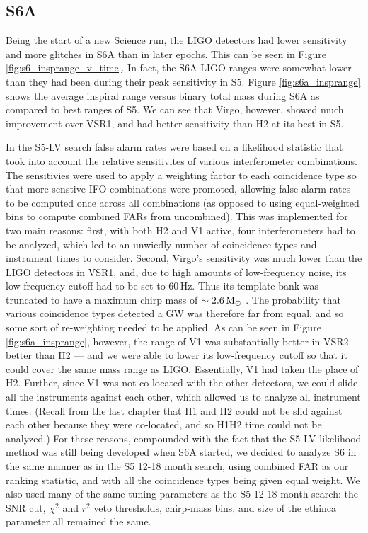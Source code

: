 \subsection{S6A}

Being the start of a new Science run, the \ac{LIGO} detectors had lower sensitivity and more glitches in S6A than in later epochs. This can be seen in Figure \ref{fig:s6_insprange_v_time}. In fact, the S6A \ac{LIGO} ranges were somewhat lower than they had been during their peak sensitivity in \ac{S5}. Figure \ref{fig:s6a_insprange} shows the average inspiral range versus binary total mass during S6A as compared to best ranges of \ac{S5}. We can see that Virgo, however, showed much improvement over VSR1, and had better sensitivity than H2 at its best in \ac{S5}.

In the \ac{S5}-LV search false alarm rates were based on a likelihood statistic that took into account the relative sensitivites of various interferometer combinations. The sensitivies were used to apply a weighting factor to each coincidence type so that more senstive \ac{IFO} combinations were promoted, allowing false alarm rates to be computed once across all combinations (as opposed to using equal-weighted bins to compute combined \acp{FAR} from uncombined). This was implemented for two main reasons: first, with both H2 and V1 active, four interferometers had to be analyzed, which led to an unwiedly number of coincidence types and instrument times to consider. Second, Virgo's sensitivity was much lower than the \ac{LIGO} detectors in VSR1, and, due to high amounts of low-frequency noise, its low-frequency cutoff had to be set to $60\,$Hz. Thus its template bank was truncated to have a maximum chirp mass of $\sim2.6\,\mathrm{M_\odot}$ \cite{ref:s5lvc}. The probability that various coincidence types detected a \ac{GW} was therefore far from equal, and so some sort of re-weighting needed to be applied. As can be seen in Figure \ref{fig:s6a_insprange}, however, the range of V1 was substantially better in \ac{VSR2} --- better than H2 --- and we were able to lower its low-frequency cutoff so that it could cover the same mass range as \ac{LIGO}. Essentially, V1 had taken the place of H2. Further, since V1 was not co-located with the other detectors, we could slide all the instruments against each other, which allowed us to analyze all instrument times. (Recall from the last chapter that H1 and H2 could not be slid against each other because they were co-located, and so H1H2 time could not be analyzed.) For these reasons, compounded with the fact that the \ac{S5}-LV likelihood method was still being developed when S6A started, we decided to analyze \ac{S6} in the same manner as in the \ac{S5} 12-18 month search, using combined \ac{FAR} as our ranking statistic, and with all the coincidence types being given equal weight. We also used many of the same tuning parameters as the \ac{S5} 12-18 month search: the \ac{SNR} cut, $\chi^2$ and $r^2$ veto thresholds, chirp-mass bins, and size of the ethinca parameter all remained the same.


